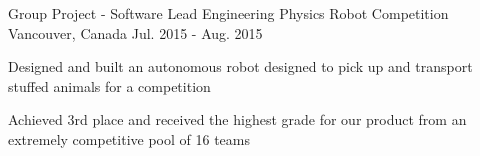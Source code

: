 \begin{cventries}





\cventry
{Group Project - Software Lead} %
{Engineering Physics Robot Competition} %
{Vancouver, Canada} %
{Jul. 2015 - Aug. 2015} %
{ %
\begin{cvitems}
\item {Designed and built an autonomous robot designed to pick up and transport stuffed animals for a competition}
\item {Achieved 3rd place and received the highest grade for our product from an extremely competitive pool of 16 teams}
\end{cvitems}
}




\end{cventries}
